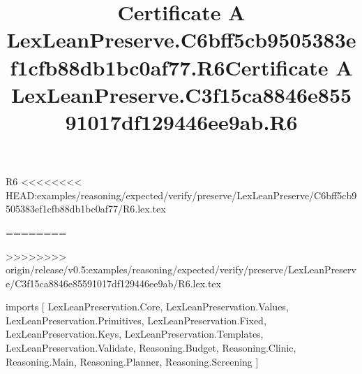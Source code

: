 \begin{lexlean}{R6}
<<<<<<<< HEAD:examples/reasoning/expected/verify/preserve/LexLeanPreserve/C6bff5cb9505383ef1cfb88db1bc0af77/R6.lex.tex
\title{Certificate A LexLeanPreserve.C6bff5cb9505383ef1cfb88db1bc0af77.R6}
========
\title{Certificate A LexLeanPreserve.C3f15ca8846e85591017df129446ee9ab.R6}
>>>>>>>> origin/release/v0.5:examples/reasoning/expected/verify/preserve/LexLeanPreserve/C3f15ca8846e85591017df129446ee9ab/R6.lex.tex
\begin{coremodule}
imports [
  LexLeanPreservation.Core,
  LexLeanPreservation.Values,
  LexLeanPreservation.Primitives,
  LexLeanPreservation.Fixed,
  LexLeanPreservation.Keys,
  LexLeanPreservation.Templates,
  LexLeanPreservation.Validate,
  Reasoning.Budget,
  Reasoning.Clinic,
  Reasoning.Main,
  Reasoning.Planner,
  Reasoning.Screening
]


\end{coremodule}
\end{lexlean}
